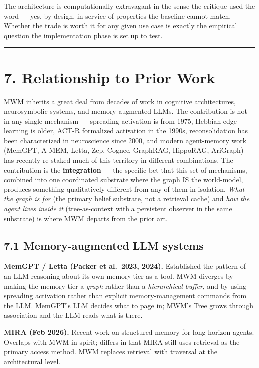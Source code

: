 \documentclass[12pt]{article}
\begin{document}
The architecture is computationally extravagant in the sense the critique used the word --- yes, by design, in service of properties the baseline cannot match. Whether the trade is worth it for any given use case is exactly the empirical question the implementation phase is set up to test.

\begin{center}\rule{0.5\linewidth}{0.5pt}\end{center}

\section{7. Relationship to Prior Work}\label{relationship-to-prior-work}

MWM inherits a great deal from decades of work in cognitive architectures, neurosymbolic systems, and memory-augmented LLMs. The contribution is not in any single mechanism --- spreading activation is from 1975, Hebbian edge learning is older, ACT-R formalized activation in the 1990s, reconsolidation has been characterized in neuroscience since 2000, and modern agent-memory work (MemGPT, A-MEM, Letta, Zep, Cognee, GraphRAG, HippoRAG, AriGraph) has recently re-staked much of this territory in different combinations. The contribution is the \textbf{integration} --- the specific bet that this set of mechanisms, combined into one coordinated substrate where the graph IS the world-model, produces something qualitatively different from any of them in isolation. \emph{What the graph is for} (the primary belief substrate, not a retrieval cache) and \emph{how the agent lives inside it} (tree-as-context with a persistent observer in the same substrate) is where MWM departs from the prior art.

\subsection{7.1 Memory-augmented LLM systems}\label{memory-augmented-llm-systems}

\textbf{MemGPT / Letta (Packer et al.~2023, 2024).} Established the pattern of an LLM reasoning about its own memory tier as a tool. MWM diverges by making the memory tier a \emph{graph} rather than a \emph{hierarchical buffer}, and by using spreading activation rather than explicit memory-management commands from the LLM. MemGPT's LLM decides what to page in; MWM's Tree grows through association and the LLM reads what is there.

\textbf{MIRA (Feb 2026).} Recent work on structured memory for long-horizon agents. Overlaps with MWM in spirit; differs in that MIRA still uses retrieval as the primary access method. MWM replaces retrieval with traversal at the architectural level.
\end{document}
